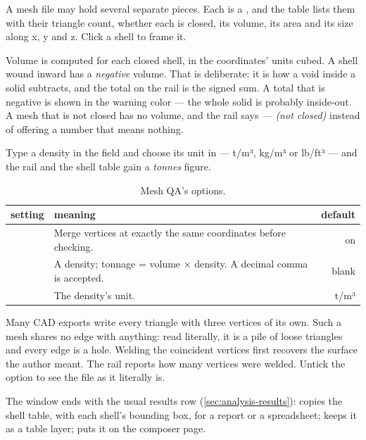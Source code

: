 A mesh file may hold several separate pieces. Each is a , and the table lists them with their triangle count, whether each is closed, its volume, its area and its size along x, y and z. Click a shell to frame it.

Volume is computed for each closed shell, in the coordinates' units cubed. A shell wound inward has a \emph{negative} volume. That is deliberate: it is how a void inside a solid subtracts, and the total on the rail is the signed sum. A total that is negative is shown in the warning color — the whole solid is probably inside-out. A mesh that is not closed has no volume, and the rail says \emph{— (not closed)} instead of offering a number that means nothing.

Type a density in the  field and choose its unit in  — t/m³, kg/m³ or lb/ft³ — and the rail and the shell table gain a \emph{tonnes} figure.

\begin{table}[htbp]\small
\begin{tabularx}{\linewidth}{@{}lMD@{}}\toprule
setting & meaning & default \\ \midrule
{} & Merge vertices at exactly the same coordinates before checking. & on \\
 & A density; tonnage = volume × density. A decimal comma is accepted. & blank \\
 & The density's unit. & t/m³ \\ \bottomrule
\end{tabularx}
\caption{Mesh QA's options.}\label{tab:qa-mesh-opts}
\end{table}

\begin{why}
Many CAD exports write every triangle with three vertices of its own. Such a mesh shares no edge with anything: read literally, it is a pile of loose triangles and every edge is a hole. Welding the coincident vertices first recovers the surface the author meant. The rail reports how many vertices were welded. Untick the option to see the file as it literally is.
\end{why}

The window ends with the usual results row (\cref{sec:analysis-results}):  copies the shell table, with each shell's bounding box, for a report or a spreadsheet;  keeps it as a table layer;  puts it on the composer page.

